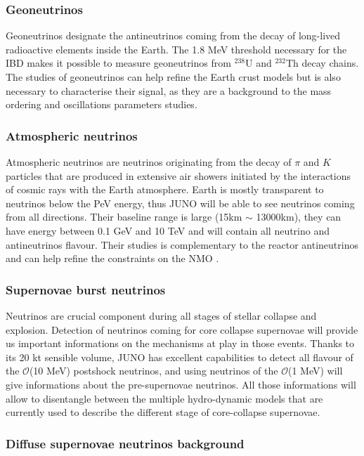 \documentclass[../main.tex]{subfiles}
\begin{document}
\subsubsection{Geoneutrinos}

Geoneutrinos designate the antineutrinos coming from the decay of long-lived radioactive elements inside the Earth. The 1.8 MeV threshold necessary for the IBD makes it possible to measure geoneutrinos from $^{238}$U and $^{232}$Th decay chains. The studies of geoneutrinos can help refine the Earth crust models but is also necessary to characterise their signal, as they are a background to the mass ordering and oscillations parameters studies.

\subsubsection{Atmospheric neutrinos}

Atmospheric neutrinos are neutrinos originating from the decay of $\pi$ and $K$ particles that are produced in extensive air showers initiated by the interactions of cosmic rays with the Earth atmosphere. Earth is mostly transparent to neutrinos below the PeV energy, thus JUNO will be able to see neutrinos coming from all directions. Their baseline range is large (15km $\sim$ 13000km), they can have energy between 0.1 GeV and 10 TeV and will contain all neutrino and antineutrinos flavour. Their studies is complementary to the reactor antineutrinos and can help refine the constraints on the NMO \cite{an_neutrino_2016}.

\subsubsection{Supernovae burst neutrinos}

Neutrinos are crucial component during all stages of stellar collapse and explosion. Detection of neutrinos coming for core collapse supernovae will provide us important informations on the mechanisms at play in those events.
Thanks to its 20 kt sensible volume, JUNO has excellent capabilities to detect all flavour of the $\mathcal{O}$(10 MeV) postshock neutrinos, and using neutrinos of the $\mathcal{O}$(1 MeV) will give informations about the pre-supernovae neutrinos. All those informations will allow to disentangle between the multiple hydro-dynamic models that are currently used to describe the different stage of core-collapse supernovae.

\subsubsection{Diffuse supernovae neutrinos background}
\end{document}
